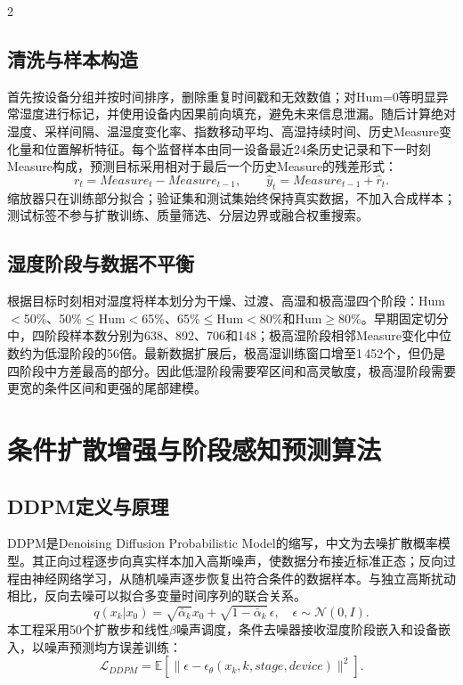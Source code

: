 \documentclass[UTF8,a4paper,10pt]{ctexart}
\begin{document}
\begin{multicols}{2}
\subsection{清洗与样本构造}
首先按设备分组并按时间排序，删除重复时间戳和无效数值；对Hum=0等明显异常湿度进行标记，并使用设备内因果前向填充，避免未来信息泄漏。随后计算绝对湿度、采样间隔、温湿度变化率、指数移动平均、高湿持续时间、历史Measure变化量和位置解析特征。每个监督样本由同一设备最近24条历史记录和下一时刻Measure构成，预测目标采用相对于最后一个历史Measure的残差形式：
\begin{equation}
r_t=Measure_t-Measure_{t-1},\qquad \hat y_t=Measure_{t-1}+\hat r_t.
\end{equation}
缩放器只在训练部分拟合；验证集和测试集始终保持真实数据，不加入合成样本；测试标签不参与扩散训练、质量筛选、分层边界或融合权重搜索。

\subsection{湿度阶段与数据不平衡}
根据目标时刻相对湿度将样本划分为干燥、过渡、高湿和极高湿四个阶段：Hum$<$50\%、50\%$\leq$Hum$<$65\%、65\%$\leq$Hum$<$80\%和Hum$\geq$80\%。早期固定切分中，四阶段样本数分别为638、892、706和148；极高湿阶段相邻Measure变化中位数约为低湿阶段的56倍。最新数据扩展后，极高湿训练窗口增至1\,452个，但仍是四阶段中方差最高的部分。因此低湿阶段需要窄区间和高灵敏度，极高湿阶段需要更宽的条件区间和更强的尾部建模。

\section{条件扩散增强与阶段感知预测算法}
\subsection{DDPM定义与原理}
DDPM是Denoising Diffusion Probabilistic Model的缩写，中文为去噪扩散概率模型。其正向过程逐步向真实样本加入高斯噪声，使数据分布接近标准正态；反向过程由神经网络学习，从随机噪声逐步恢复出符合条件的数据样本。与独立高斯扰动相比，反向去噪可以拟合多变量时间序列的联合关系。
\begin{equation}
q(x_k|x_0)=\sqrt{\bar\alpha_k}x_0+\sqrt{1-\bar\alpha_k}\,\epsilon,\quad \epsilon\sim\mathcal N(0,I).
\end{equation}
本工程采用50个扩散步和线性$\beta$噪声调度，条件去噪器接收湿度阶段嵌入和设备嵌入，以噪声预测均方误差训练：
\begin{equation}
\mathcal L_{DDPM}=\mathbb E\left[\|\epsilon-\epsilon_\theta(x_k,k,stage,device)\|^2\right].
\end{equation}


\end{multicols}
\end{document}
